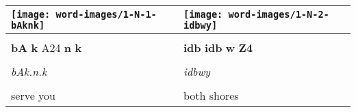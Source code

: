 \vspace{7.5mm}

\begin{tabularx}{\linewidth}{YY}
	\texttt{[image: word-images/1-N-1-bAknk]} &
	\texttt{[image: word-images/1-N-2-idbwy]} \\
	\hline \\ 
	\textbf{bA} \textbf{k} A24 \textbf{n} \textbf{k} &
	\textbf{idb} \textbf{idb} \textbf{w} \textbf{Z4} \\
	\hline \\ 
	\textit{bAk.n.k} & \textit{idbwy} \\
	\hline \\ 
	serve you & both shores
\end{tabularx}

\vspace*{\fill}

